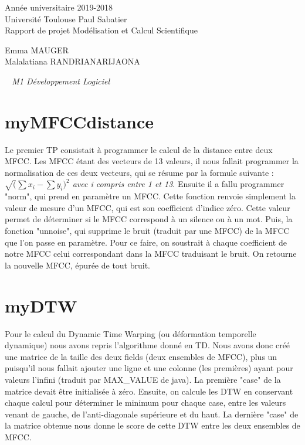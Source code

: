 \documentclass[a4paper,12pt]{article}
\begin{document}
\begin{center}
	
		\Large{Année universitaire 2019-2018}\\
		\Large{Université Toulouse Paul Sabatier}\\[1cm]
		
		\huge{Rapport de projet Modélisation et Calcul Scientifique}\\
		\vspace{3cm}
		
		Emma MAUGER\\
		Malalatiana RANDRIANARIJAONA
		
	\normalsize{\textit{ ~ M1 Développement Logiciel}}\\
		\medskip
		\vspace{2cm}
		
	\end{center}

\newpage
\tableofcontents
{}
\newpage

\section{myMFCCdistance}

Le premier TP consistait à programmer le calcul de la distance entre deux MFCC. Les MFCC étant des vecteurs de 13 valeurs, il nous fallait programmer la normalisation de ces deux vecteurs, qui se résume par la formule suivante : \emph{$\sqrt({\sum{x_i} - \sum{y_i})^2}$ avec i compris entre 1 et 13}.
Ensuite il a fallu programmer "norm", qui prend en paramètre un MFCC. Cette fonction renvoie simplement la valeur de mesure d'un MFCC, qui est son coefficient d'indice zéro. Cette valeur permet de déterminer si le MFCC correspond à un silence ou à un mot.
Puis, la fonction "unnoise", qui supprime le bruit (traduit par une MFCC) de la MFCC que l'on passe en paramètre. Pour ce faire, on soustrait à chaque coefficient de notre MFCC celui correspondant dans la MFCC traduisant le bruit. On retourne la nouvelle MFCC, épurée de tout bruit.

\section{myDTW}

Pour le calcul du Dynamic Time Warping (ou déformation temporelle dynamique) nous avons repris l'algorithme donné en TD. Nous avons donc créé une matrice de la taille des deux fields (deux ensembles de MFCC), plus un puisqu'il nous fallait ajouter une ligne et une colonne (les premières) ayant pour valeurs l'infini (traduit par MAX\_VALUE de java). La première "case" de la matrice devait être initialisée à zéro.
Ensuite, on calcule les DTW en conservant chaque calcul pour déterminer le minimum pour chaque case, entre les valeurs venant de gauche, de l'anti-diagonale supérieure et du haut. La dernière "case" de la matrice obtenue nous donne le score de cette DTW entre les deux ensembles de MFCC.
\end{document}
